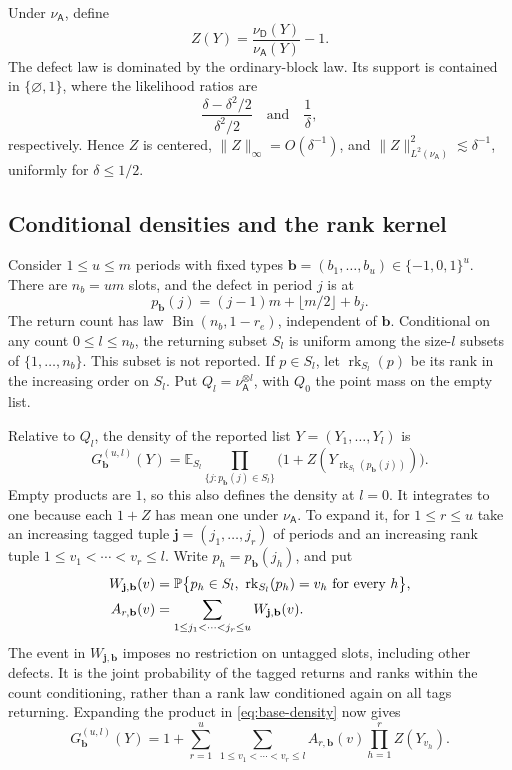 Under \(\nu_{\mathsf A}\), define
\[
 Z(Y)=\frac{\nu_{\mathsf D}(Y)}{\nu_{\mathsf A}(Y)}-1.
\]
The defect law is dominated by the ordinary-block law. Its support is contained in \(\{\varnothing,1\}\), where the likelihood ratios are
\[
 \frac{\delta-\delta^2/2}{\delta^2/2}
 \quad\text{and}\quad \frac1\delta,
\]
respectively. Hence \(Z\) is centered, \(\|Z\|_\infty=O(\delta^{-1})\), and
\(\|Z\|_{L^2(\nu_{\mathsf A})}^2\lesssim\delta^{-1}\), uniformly for \(\delta\le1/2\).

\subsection{Conditional densities and the rank kernel}

Consider \(1\le u\le m\) periods with fixed types
\(\mathbf b=(b_1,\ldots,b_u)\in\{-1,0,1\}^u\). There are \(n_b=um\) slots, and the defect in period \(j\) is at
\[
 p_{\mathbf b}(j)=(j-1)m+\lfloor m/2\rfloor+b_j.
\]
The return count has law \(\operatorname{Bin}(n_b,1-r_e)\), independent of \(\mathbf b\). Conditional on any count \(0\le l\le n_b\), the returning subset \(S_l\) is uniform among the size-\(l\) subsets of \(\{1,\ldots,n_b\}\). This subset is not reported. If \(p\in S_l\), let \(\operatorname{rk}_{S_l}(p)\) be its rank in the increasing order on \(S_l\). Put \(Q_l=\nu_{\mathsf A}^{\otimes l}\), with \(Q_0\) the point mass on the empty list.

Relative to \(Q_l\), the density of the reported list \(Y=(Y_1,\ldots,Y_l)\) is
\begin{equation}\label{eq:base-density}
 G_{\mathbf b}^{(u,l)}(Y)
 =\mathbb E_{S_l}
   \prod_{\{j:p_{\mathbf b}(j)\in S_l\}}
       \bigl(1+Z(Y_{\operatorname{rk}_{S_l}(p_{\mathbf b}(j))})\bigr).
\end{equation}
Empty products are \(1\), so this also defines the density at \(l=0\). It integrates to one because each \(1+Z\) has mean one under \(\nu_{\mathsf A}\). To expand it, for \(1\le r\le u\) take an increasing tagged tuple
\(\mathbf j=(j_1,\ldots,j_r)\) of periods and an increasing rank tuple
\(1\le v_1<\cdots<v_r\le l\). Write \(p_h=p_{\mathbf b}(j_h)\), and put
\begin{equation}\label{eq:base-rank-event}
\begin{split}
 W_{\mathbf j,\mathbf b}(v)
 &=\Prob\bigl\{
 p_h\in S_l,\ 
 \operatorname{rk}_{S_l}(p_h)=v_h
 \text{ for every }h
 \bigr\},\\
 A_{r,\mathbf b}(v)&=\sum_{1\le j_1<\cdots<j_r\le u}
                         W_{\mathbf j,\mathbf b}(v).
\end{split}
\end{equation}
The event in \(W_{\mathbf j,\mathbf b}\) imposes no restriction on untagged slots, including other defects. It is the joint probability of the tagged returns and ranks within the count conditioning, rather than a rank law conditioned again on all tags returning.
Expanding the product in \eqref{eq:base-density} now gives
\begin{equation}\label{eq:base-density-expansion}
 G_{\mathbf b}^{(u,l)}(Y)
 =1+\sum_{r=1}^{u}\ \sum_{1\le v_1<\cdots<v_r\le l}
       A_{r,\mathbf b}(v)\prod_{h=1}^r Z(Y_{v_h}).
\end{equation}

